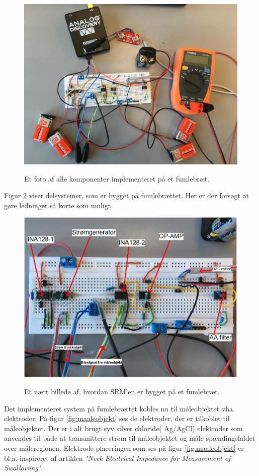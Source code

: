 \begin{figure}[H]
\centering
{\includegraphics[width=12cm]
{Figure/SamledeSystem}}
\caption{Et foto af alle komponenter implementeret på et fumlebræt. }
\label{fig:integrationstestBilleder1}
\end{figure} 


Figur \ref{aaspectrumimplementering} viser delsystemer, som er bygget på fumlebrættet. Her er der forsøgt at gøre ledninger så korte som muligt. 

\begin{figure}[H] 
\centering
{\includegraphics[width=12cm]
{Figure/aaspectrumimplementering}}
\caption{Et nært billede af, hvordan SRM'en er bygget på et fumlebræt.}
\label{aaspectrumimplementering}
\end{figure}

\pagebreak


Det implementeret system på fumlebrættet kobles nu til måleobjektet vha. elektroder. På figur \ref{fig:maaleobjekt} ses de elektroder, der er tilkoblet til måleobjektet. Der er i alt brugt syv silver chloride( Ag/AgCl) elektroder som anvendes til både at transmittere strøm til måleobjektet og måle spændingsfaldet over måleregionen. Elektrode placeringen som ses på figur \ref{fig:maaleobjekt} er bl.a. inspireret af artiklen \textit{"Neck Electrical Impedance for Measurement of Swallowing"}.     

